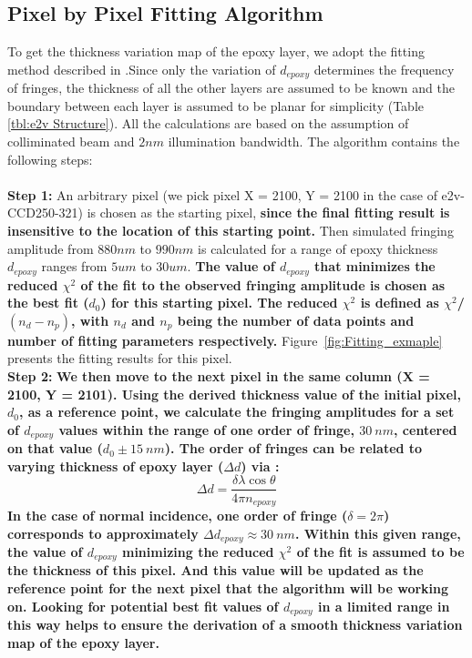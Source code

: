 \documentclass[twocolumn]{aastex63} %
\begin{document}
\begin{CJK*}{UTF8}{gbsn}
\subsection{Pixel by Pixel Fitting Algorithm}
To get the thickness variation map of the epoxy layer, we adopt the fitting method described in \citet{Malumuth03}.Since only the variation of $d_{epoxy}$ determines the frequency of fringes, the thickness of all the other layers are assumed to be known and the boundary between each layer is assumed to be planar for simplicity (Table \ref{tbl:e2v Structure}). All the calculations are based on the assumption of colliminated beam and $2nm$ illumination bandwidth.
The algorithm contains the following steps: \\ \\
\textbf{Step 1:} An arbitrary pixel (we pick pixel X = 2100, Y = 2100 in the case of e2v-CCD250-321) is chosen as the starting pixel, \textbf{since the final fitting result is insensitive to the location of this starting point.} Then simulated fringing amplitude from $880nm$ to $990nm$ is calculated for a range of epoxy thickness $d_{epoxy}$ ranges from $5um$ to $30um$. \textbf{The value of $d_{epoxy}$ that minimizes the reduced $\chi^2$ of the fit to the observed fringing amplitude is chosen as the best fit ($d_0$) for this starting pixel. The reduced $\chi^2$ is defined as ${\chi^2}$/${(n_d-n_p)}$, with $n_d$ and $n_p$ being the number of data points and number of fitting parameters respectively.} Figure~\ref{fig:Fitting_exmaple} presents the fitting results for this pixel.\\
\textbf{Step 2:} \textbf{We then move to the next pixel in the same column (X = 2100, Y = 2101). Using the derived thickness value of the initial pixel, $d_0$, as a reference point, we calculate the fringing amplitudes for a set of $d_{epoxy}$ values within the range of one order of fringe, $30\ nm$, centered on that value ($d_0\pm 15\ nm$). The order of fringes can be related to varying thickness of epoxy layer ($\Delta d$) via \citep{James87}:
\begin{equation*}
    \Delta d = \frac{\delta \lambda \cos{\theta}}{4\pi n_{epoxy}}
\end{equation*}
In the case of normal incidence, one order of fringe ($\delta = 2\pi$) corresponds to approximately $\Delta d_{epoxy} \approx 30\ nm$.
Within this given range, the value of $d_{epoxy}$ minimizing the reduced $\chi^2$ of the fit is assumed to be the thickness of this pixel. And this value will be updated as the reference point for the next pixel that the algorithm will be working on. Looking for potential best fit values of $d_{epoxy}$ in a limited range in this way helps to ensure the derivation of a smooth thickness variation map of the epoxy layer.}\\

\end{CJK*}
\end{document}
